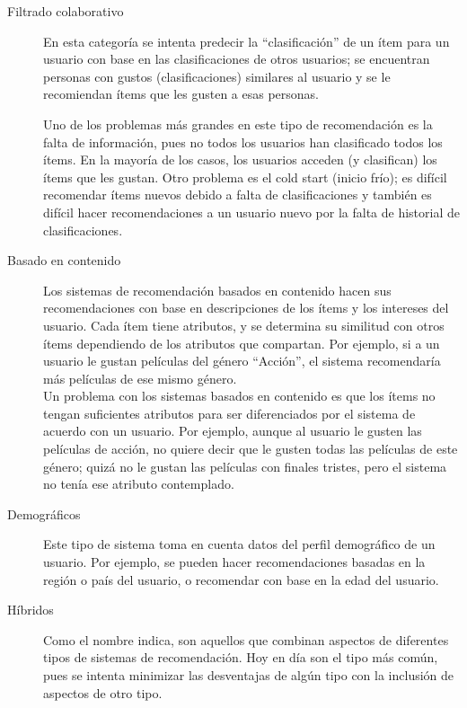     \begin{description}
        \item[Filtrado colaborativo] En esta categoría se intenta predecir la “clasificación” de un ítem para un usuario con base en las 
        clasificaciones de otros usuarios; se encuentran personas con gustos (clasificaciones) similares al usuario y se le recomiendan 
        ítems que les gusten a esas personas.\\
        \newline

    Uno de los problemas más grandes en este tipo de recomendación es la falta de información, pues no todos los usuarios han 
    clasificado todos los ítems. En la mayoría de los casos, los usuarios acceden (y clasifican) los ítems que les gustan. Otro problema
    es el cold start (inicio frío); es difícil recomendar ítems nuevos debido a falta de clasificaciones y también es difícil hacer 
     recomendaciones a un usuario nuevo por la falta de historial de clasificaciones. \cite{mc1}
        \item[Basado en contenido] Los sistemas de recomendación basados en contenido hacen sus recomendaciones con base en descripciones de los 
    ítems y los intereses del usuario. Cada ítem tiene atributos, y se determina su similitud con otros ítems dependiendo de los 
    atributos que compartan. Por ejemplo, si a un usuario le gustan películas del género “Acción”, el sistema recomendaría más películas de ese mismo género.\\
    \newline
    Un problema con los sistemas basados en contenido es que los ítems no tengan suficientes atributos para ser diferenciados por el 
    sistema de acuerdo con un usuario. Por ejemplo, aunque al usuario le gusten las películas de acción, no quiere decir que le gusten 
    todas las películas de este género; quizá no le gustan las películas con finales tristes, pero el sistema no tenía ese atributo 
    contemplado. \cite{mc4}
    
    \item[Demográficos] Este tipo de sistema toma en cuenta datos del perfil demográfico de un usuario. Por ejemplo, se pueden hacer recomendaciones basadas en la región o país del usuario, o recomendar con base en la edad del usuario.\cite{mc5}
    \item[Híbridos] Como el nombre indica, son aquellos que combinan aspectos de diferentes tipos de sistemas de recomendación. Hoy en día son el tipo más común, pues se intenta minimizar las desventajas de algún tipo con la inclusión de aspectos de otro tipo.
    
    
    \end{description}
